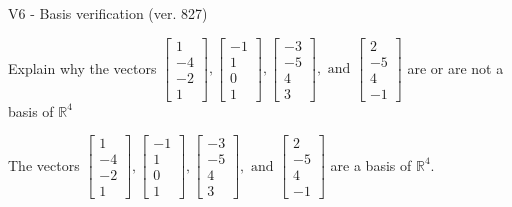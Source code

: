 \begin{exercise}
  \begin{exerciseTitle}V6 - Basis verification (ver. 827)\end{exerciseTitle}
  \begin{exerciseStatement}
    Explain why the vectors \(\left[\begin{array}{r}
1 \\
-4 \\
-2 \\
1
\end{array}\right] , \left[\begin{array}{r}
-1 \\
1 \\
0 \\
1
\end{array}\right] , \left[\begin{array}{r}
-3 \\
-5 \\
4 \\
3
\end{array}\right] , \text{ and } \left[\begin{array}{r}
2 \\
-5 \\
4 \\
-1
\end{array}\right]\) are or are not a basis of \(\mathbb{R}^4\)	


  \end{exerciseStatement}
  \begin{exerciseAnswer}
   The vectors \(\left[\begin{array}{r}
1 \\
-4 \\
-2 \\
1
\end{array}\right] , \left[\begin{array}{r}
-1 \\
1 \\
0 \\
1
\end{array}\right] , \left[\begin{array}{r}
-3 \\
-5 \\
4 \\
3
\end{array}\right] , \text{ and } \left[\begin{array}{r}
2 \\
-5 \\
4 \\
-1
\end{array}\right]\) 
  	 are  a basis of \(\mathbb{R}^4\).
  


  \end{exerciseAnswer}
\end{exercise}